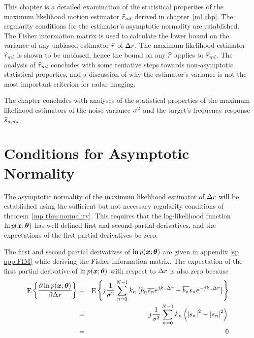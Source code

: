 This chapter is a detailed examination of the statistical properties of the
maximum likelihood motion estimator $\widehat{r}_{ml}$ derived in chapter~\ref{ml chp}.
The regularity conditions for the estimator's asymptotic normality are
established.  The Fisher information matrix is used to calculate the \CR
lower bound on the variance of any unbiased estimator $\widehat{r}$ of ${\Delta r}$.  The
maximum likelihood estimator $\widehat{r}_{ml}$ is shown to be unbiased, hence the \CR
bound on any $\widehat{r}$ applies to $\widehat{r}_{ml}$.  The analysis of $\widehat{r}_{ml}$ concludes
with some tentative steps towards non-asymptotic statistical properties, and
a discussion of why the estimator's variance is not the most important
criterion for radar imaging.

The chapter concludes with analyses of the statistical properties of the
maximum likelihood estimators of the noise variance ${\sigma^2}$ and the target's
frequency response $\widehat{s}_{n,ml}$.

\section{Conditions for Asymptotic Normality}
\label{sp sec:normality}

The asymptotic normality of the maximum likelihood estimator of ${\Delta r}$ will
be established using the sufficient but not necessary regularity conditions
of theorem~\ref{mp thm:normality}.  This requires that the log-likelihood
function $\ln p(\bm{x};\bm{\theta})$ has well-defined first and second partial
derivatives, and the expectations of the first partial derivatives be zero.

The first and second partial derivatives of $\ln p(\bm{x};\bm{\theta})$ are given in
appendix \ref{sp app:FIM} while deriving the Fisher information matrix.
The expectation of the first partial derivative of $\ln p(\bm{x};\bm{\theta})$ with
respect to ${\Delta r}$ is also zero because
\begin{eqnarray}
{\mathop{\rm E}\nolimits\left\{\frac{{\partial}\ln p(\bm{x};\bm{\theta})}{{\partial}{\Delta r}}\right\}}
&=&{\mathop{\rm E}\nolimits\left\{j\frac{1}{{\sigma^2}}\sum_{n=0}^{N-1}k_n\left( 
b_n\overline{s_n}{e^{jk_n{\Delta r}}}-\overline{b_n}s_n{e^{-jk_n{\Delta r}}}\right)\right\}}{\nonumber}\\
&=&j\frac{1}{{\sigma^2}}\sum_{n=0}^{N-1}k_n
\left(\left|s_n\right|^2-\left|s_n\right|^2\right){\nonumber}\\
&=&0
\end{eqnarray}

